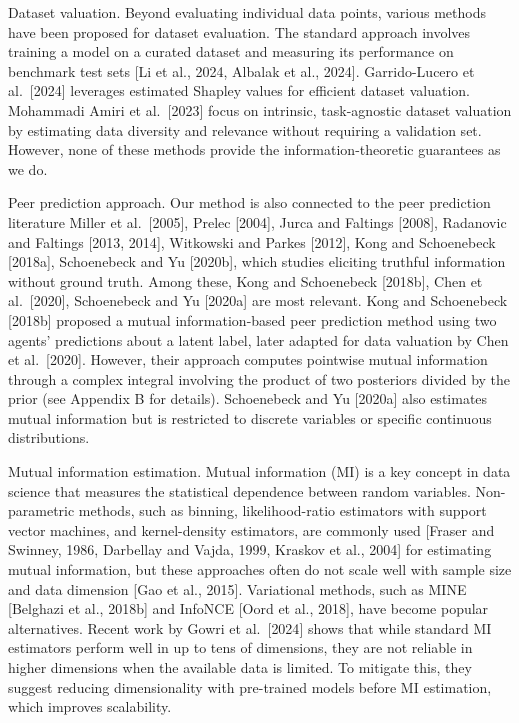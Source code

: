 Dataset valuation. Beyond evaluating individual data points, various
methods have been proposed for dataset evaluation. The standard approach
involves training a model on a curated dataset and measuring its
performance on benchmark test sets {[}Li et al., 2024, Albalak et al.,
2024{]}. Garrido-Lucero et al.~{[}2024{]} leverages estimated Shapley
values for efficient dataset valuation. Mohammadi Amiri et
al.~{[}2023{]} focus on intrinsic, task-agnostic dataset valuation by
estimating data diversity and relevance without requiring a validation
set. However, none of these methods provide the information-theoretic
guarantees as we do.

Peer prediction approach. Our method is also connected to the peer
prediction literature Miller et al.~{[}2005{]}, Prelec {[}2004{]}, Jurca
and Faltings {[}2008{]}, Radanovic and Faltings {[}2013, 2014{]},
Witkowski and Parkes {[}2012{]}, Kong and Schoenebeck {[}2018a{]},
Schoenebeck and Yu {[}2020b{]}, which studies eliciting truthful
information without ground truth. Among these, Kong and Schoenebeck
{[}2018b{]}, Chen et al.~{[}2020{]}, Schoenebeck and Yu {[}2020a{]} are
most relevant. Kong and Schoenebeck {[}2018b{]} proposed a mutual
information-based peer prediction method using two agents' predictions
about a latent label, later adapted for data valuation by Chen et
al.~{[}2020{]}. However, their approach computes pointwise mutual
information through a complex integral involving the product of two
posteriors divided by the prior (see Appendix B for details).
Schoenebeck and Yu {[}2020a{]} also estimates mutual information but is
restricted to discrete variables or specific continuous distributions.

Mutual information estimation. Mutual information (MI) is a key concept
in data science that measures the statistical dependence between random
variables. Non-parametric methods, such as binning, likelihood-ratio
estimators with support vector machines, and kernel-density estimators,
are commonly used {[}Fraser and Swinney, 1986, Darbellay and Vajda,
1999, Kraskov et al., 2004{]} for estimating mutual information, but
these approaches often do not scale well with sample size and data
dimension {[}Gao et al., 2015{]}. Variational methods, such as MINE
{[}Belghazi et al., 2018b{]} and InfoNCE {[}Oord et al., 2018{]}, have
become popular alternatives. Recent work by Gowri et al.~{[}2024{]}
shows that while standard MI estimators perform well in up to tens of
dimensions, they are not reliable in higher dimensions when the
available data is limited. To mitigate this, they suggest reducing
dimensionality with pre-trained models before MI estimation, which
improves scalability.

